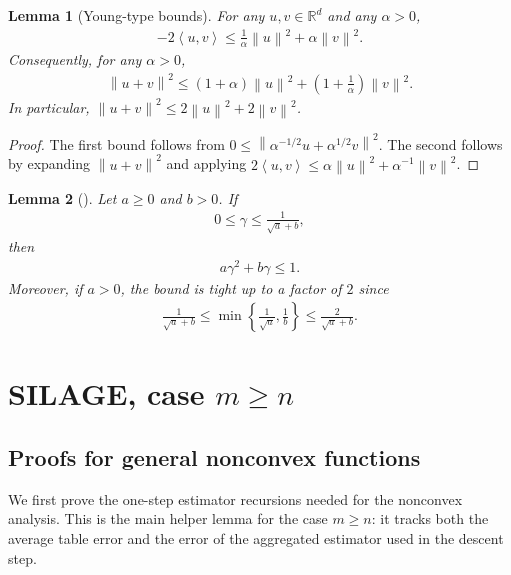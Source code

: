 \documentclass{article}
\newcommand{\bb}{\mathbb}
\newcommand{\inner}[2]{\left\langle #1, #2 \right\rangle}
\newcommand{\R}{\bb R}
\newcommand{\sqn}[1]{\left\| #1 \right\|^2}
\theoremstyle{plain}
\newtheorem{lemma}{Lemma}
\newcommand{\algname}[1]{{\sf\scalefont{0.88}\color{mydarkgreen}#1}\xspace}
\def\algname#1{#1}%
\begin{document}
\begin{lemma}[Young-type bounds]\label{lem:young_bounds}
For any $u,v\in\R^d$ and any $\alpha>0$,
\begin{align}
-2\inner{u}{v}\leq \frac{1}{\alpha}\sqn{u}+\alpha\sqn{v}.
\label{eq:young_cross_term}
\end{align}
Consequently, for any $\alpha>0$,
\begin{align}
\sqn{u+v}\leq (1+\alpha)\sqn{u}+\left(1+\frac{1}{\alpha}\right)\sqn{v}.
\label{eq:young_two_vector}
\end{align}
In particular, $\sqn{u+v}\leq 2\sqn{u}+2\sqn{v}$.
\end{lemma}
\begin{proof}
The first bound follows from
$0\leq \sqn{\alpha^{-1/2}u+\alpha^{1/2}v}$.
The second follows by expanding $\sqn{u+v}$ and applying
$2\inner{u}{v}\leq \alpha\sqn{u}+\alpha^{-1}\sqn{v}$.
\end{proof}

\begin{lemma}[\citep{li21, fat21, ric21, richtarik20223pc}]\label{lem:quadratic_step_bound}
Let $a\geq 0$ and $b>0$. If
\begin{align*}
0\leq \gamma \leq \frac{1}{\sqrt{a}+b},
\end{align*}
then
\begin{align*}
a\gamma^2+b\gamma \leq 1.
\end{align*}
Moreover, if $a>0$, the bound is tight up to a factor of $2$ since
\begin{align*}
\frac{1}{\sqrt{a}+b}\leq \min\left\{\frac{1}{\sqrt{a}},\frac{1}{b}\right\}\leq \frac{2}{\sqrt{a}+b}.
\end{align*}
\end{lemma}

\newpage
\section{\algname{SILAGE}, case $m \geq n$}

\subsection{Proofs for general nonconvex functions}

We first prove the one-step estimator recursions needed for the nonconvex analysis.
This is the main helper lemma for the case $m\ge n$: it tracks both the average table error and the error of the aggregated estimator used in the descent step.
\end{document}
